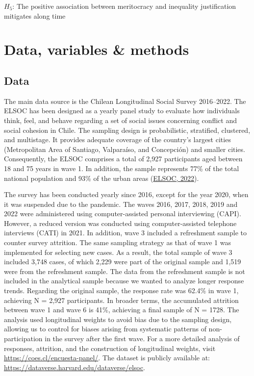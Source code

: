 \documentclass[
  12pt,
  a4paper,
]{article}
\begin{document}
\(H_5\): The positive association between meritocracy and inequality
justification mitigates along time

\hypertarget{data-variables-methods}{%
\section{Data, variables \& methods}\label{data-variables-methods}}

\hypertarget{data}{%
\subsection{Data}\label{data}}

The main data source is the Chilean Longitudinal Social Survey
2016--2022. The ELSOC has been designed as a yearly panel study to
evaluate how individuals think, feel, and behave regarding a set of
social issues concerning conflict and social cohesion in Chile. The
sampling design is probabilistic, stratified, clustered, and multistage.
It provides adequate coverage of the country's largest cities
(Metropolitan Area of Santiago, Valparaíso, and Concepción) and smaller
cities. Consequently, the ELSOC comprises a total of 2,927 participants
aged between 18 and 75 years in wave 1. In addition, the sample
represents 77\% of the total national population and 93\% of the urban
areas (\protect\hyperlink{ref-elsoc_estudio_2022}{ELSOC, 2022}).

The survey has been conducted yearly since 2016, except for the year
2020, when it was suspended due to the pandemic. The waves 2016, 2017,
2018, 2019 and 2022 were administered using computer-assisted personal
interviewing (CAPI). However, a reduced version was conducted using
computer-assisted telephone interviews (CATI) in 2021. In addition, wave
3 included a refreshment sample to counter survey attrition. The same
sampling strategy as that of wave 1 was implemented for selecting new
cases. As a result, the total sample of wave 3 included 3,748 cases, of
which 2,229 were part of the original sample and 1,519 were from the
refreshment sample. The data from the refreshment sample is not included
in the analytical sample because we wanted to analyze longer response
trends. Regarding the original sample, the response rate was 62.4\% in
wave 1, achieving N = 2,927 participants. In broader terms, the
accumulated attrition between wave 1 and wave 6 is 41\%, achieving a
final sample of N = 1728. The analysis used longitudinal weights to
avoid bias due to the sampling design, allowing us to control for biases
arising from systematic patterns of non-participation in the survey
after the first wave. For a more detailed analysis of responses,
attrition, and the construction of longitudinal weights, visit
\url{https://coes.cl/encuesta-panel/}. The dataset is publicly available
at: \url{https://dataverse.harvard.edu/dataverse/elsoc}.
\end{document}
